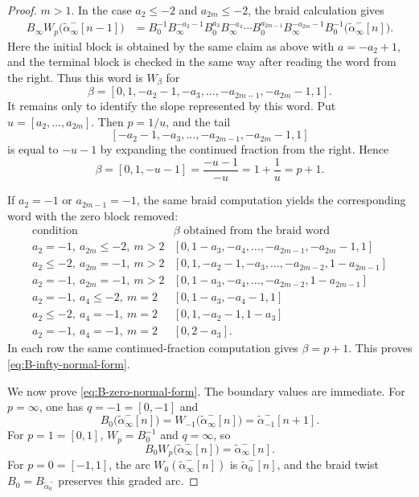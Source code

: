 \documentclass[11pt,a4paper,reqno]{amsart}%
\theoremstyle{plain}
\theoremstyle{definition}
\numberwithin{equation}{section}
\numberwithin{equation}{section}
\begin{document}
\begin{proof}
$m>1$. In the case $a_2\le -2$ and $a_{2m}\le -2$, the braid calculation gives
\[
\begin{aligned}
B_\infty W_p\bigl(\widetilde{\alpha}_\infty^-[n-1]\bigr)
&=B_0^{-1}B_\infty^{-a_2-1}B_0^{a_3}B_\infty^{-a_4}\cdots
  B_0^{a_{2m-1}}B_\infty^{-a_{2m}-1}B_0^{-1}
  \bigl(\widetilde{\alpha}_\infty^-[n]\bigr).
\end{aligned}
\]
Here the initial block is obtained by the same claim as above with
$a=-a_2+1$, and the terminal block is checked in the same way after reading the
word from the right. Thus this word is $W_\beta$ for
\[
\beta=[0,1,-a_2-1,-a_3,\ldots,-a_{2m-1},-a_{2m}-1,1].
\]
It remains only to identify the slope represented by this word. Put
$u=[a_2,\ldots,a_{2m}]$. Then $p=1/u$, and the tail
\[
[-a_2-1,-a_3,\ldots,-a_{2m-1},-a_{2m}-1,1]
\]
is equal to $-u-1$ by expanding the continued fraction from the right. Hence
\[
\beta=[0,1,-u-1]
=\frac{-u-1}{-u}
=1+\frac{1}{u}
=p+1.
\]

If $a_2=-1$ or $a_{2m-1}=-1$, 
the same braid computation yields the corresponding word with the zero block removed:
\[
\begin{array}{c|c}
\text{condition} & \beta \text{ obtained from the braid word} \\ \hline
a_2=-1,\ a_{2m}\le -2,\ m>2
& [0,1-a_3,-a_4,\ldots,-a_{2m-1},-a_{2m}-1,1]\\[2pt]
a_2\le -2,\ a_{2m}=-1,\ m>2
& [0,1,-a_2-1,-a_3,\ldots,-a_{2m-2},1-a_{2m-1}]\\[2pt]
a_2=-1,\ a_{2m}=-1,\ m>2
& [0,1-a_3,-a_4,\ldots,-a_{2m-2},1-a_{2m-1}]\\[2pt]

a_2=-1,\ a_4\le -2,\ m=2
& [0,1-a_3,-a_4-1,1]\\[2pt]
a_2\le -2,\ a_4=-1,\ m=2
& [0,1,-a_2-1,1-a_3]\\[2pt]
a_2=-1,\ a_4=-1,\ m=2
& [0,2-a_3].
\end{array}
\]
In each row the same continued-fraction computation gives $\beta=p+1$. This proves
\eqref{eq:B-infty-normal-form}.

We now prove \eqref{eq:B-zero-normal-form}. The boundary values are immediate.
For $p=\infty$, one has $q=-1=[0,-1]$ and
\[
B_0\bigl(\widetilde{\alpha}_\infty^-[n]\bigr)
=W_{-1}\bigl(\widetilde{\alpha}_\infty^-[n]\bigr)
=\widetilde{\alpha}_{-1}^-[n+1].
\]
For $p=1=[0,1]$, $W_p=B_0^{-1}$ and $q=\infty$, so
\[
B_0W_p\bigl(\widetilde{\alpha}_\infty^-[n]\bigr)
=\widetilde{\alpha}_\infty^-[n].
\]
For $p=0=[-1,1]$, the arc
$W_0(\widetilde{\alpha}_\infty^-[n])$ is $\widetilde{\alpha}_0^-[n]$, and the
braid twist $B_0=B_{\widetilde{\alpha}_0^-}$ preserves this graded arc.


\end{proof}
\end{document}
